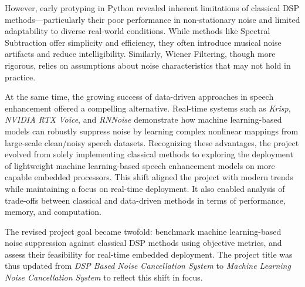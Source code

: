 However, early protyping in Python revealed inherent limitations of classical DSP methods—particularly their poor performance in non-stationary noise and limited adaptability to diverse real-world conditions. While methods like Spectral Subtraction offer simplicity and efficiency, they often introduce musical noise artifacts and reduce intelligibility. Similarly, Wiener Filtering, though more rigorous, relies on assumptions about noise characteristics that may not hold in practice.


At the same time, the growing success of data-driven approaches in speech enhancement offered a compelling alternative. Real-time systems such as \textit{Krisp}, \textit{NVIDIA RTX Voice}, and \textit{RNNoise} demonstrate how machine learning-based models can robustly suppress noise by learning complex nonlinear mappings from large-scale clean/noisy speech datasets. Recognizing these advantages, the project evolved from solely implementing classical methods to exploring the deployment of lightweight machine learning-based speech enhancement models on more capable embedded processors. This shift aligned the project with modern trends while maintaining a focus on real-time deployment. It also enabled analysis of trade-offs between classical and data-driven methods in terms of performance, memory, and computation.

The revised project goal became twofold: benchmark machine learning-based noise suppression against classical DSP methods using objective metrics, and assess their feasibility for real-time embedded deployment. The project title was thus updated from \textit{DSP Based Noise Cancellation System} to \textit{Machine Learning Noise Cancellation System} to reflect this shift in focus.